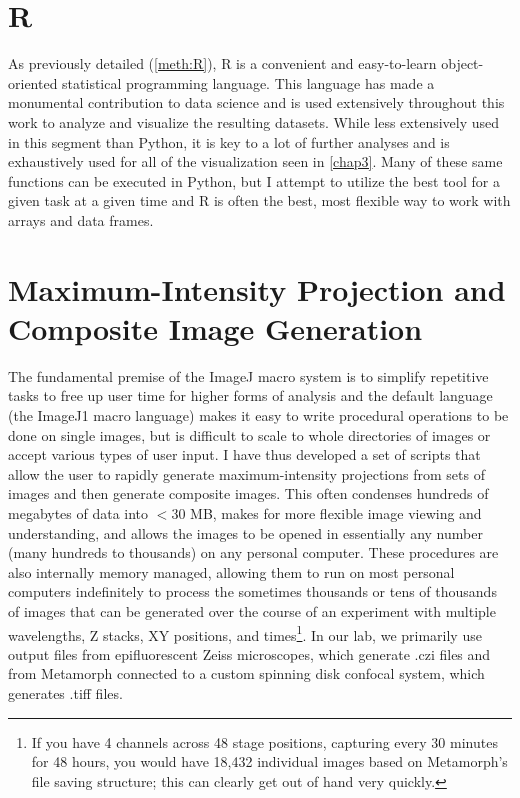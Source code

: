 \section{R}\label{R}

As previously detailed (\autoref{meth:R}), R is a convenient and easy\hyp{}to\hyp{}learn object\hyp{}oriented statistical programming language. This language has made a monumental contribution to data science and is used extensively throughout this work to analyze and visualize the resulting datasets. While less extensively used in this segment than Python, it is key to a lot of further analyses and is exhaustively used for all of the visualization seen in \autoref{chap3}. Many of these same functions can be executed in Python, but I attempt to utilize the best tool for a given task at a given time and R is often the best, most flexible way to work with arrays and data frames.

\section{Maximum\hyp{}Intensity Projection and Composite Image Generation}\label{mippers}

The fundamental premise of the ImageJ macro system is to simplify repetitive tasks to free up user time for higher forms of analysis and the default language (the ImageJ1 macro language) makes it easy to write procedural operations to be done on single images, but is difficult to scale to whole directories of images or accept various types of user input. I have thus developed a set of scripts that allow the user to rapidly generate maximum\hyp{}intensity projections from sets of images and then generate composite images. This often condenses hundreds of megabytes of data into $<$30 MB, makes for more flexible image viewing and understanding, and allows the images to be opened in essentially any number (many hundreds to thousands) on any personal computer. These procedures are also internally memory managed, allowing them to run on most personal computers indefinitely to process the sometimes thousands or tens of thousands of images that can be generated over the course of an experiment with multiple wavelengths, Z stacks, XY positions, and times\footnote{If you have 4 channels across 48 stage positions, capturing every 30 minutes for 48 hours, you would have 18,432 individual images based on Metamorph's file saving structure; this can clearly get out of hand very quickly.}. In our lab, we primarily use output files from epifluorescent Zeiss microscopes, which generate .czi files and from Metamorph connected to a custom spinning disk confocal system, which generates .tiff files.

